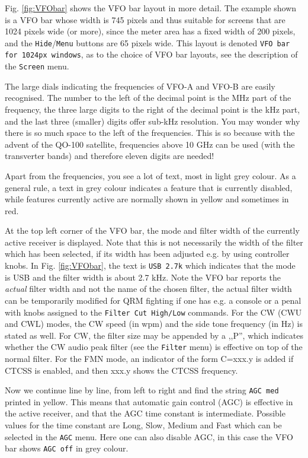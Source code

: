 \documentclass[12pt]{book}
\def\rett#1{\texttt{\color{red}#1}}
\def\bltt#1{\texttt{\color{blue}#1}}
\begin{document}
Fig. \ref{fig:VFObar} shows the VFO bar layout in more  detail.
The example shown is a VFO bar whose width is 745 pixels and
thus suitable for screens that are 1024 pixels wide (or more),
since the meter area has a fixed width of 200 pixels, and
the \rett{Hide}/\rett{Menu} buttons are 65 pixels wide. This layout is
denoted \texttt{VFO bar for 1024px windows}, as to the choice
of VFO bar layouts, see the description of the \bltt{Screen} menu.

The large dials indicating the frequencies of VFO-A and VFO-B
are easily recognised. The number to the left of the decimal
point is the MHz part of the frequency, the three  large digits
to the right  of  the decimal point is the kHz part, and
the last three (smaller) digits offer sub-kHz resolution.
You may wonder why there is  so much space to the left of
the frequencies. This is so because with the advent of
the QO-100 satellite, frequencies above 10 GHz can be
used (with the transverter bands) and therefore eleven
digits are needed!

Apart from the frequencies, you see a lot  of text, most in
light grey colour. As a general rule, a text  in grey
colour indicates a feature that is currently disabled,
while features currently active are normally shown in
yellow and sometimes in red.

At the top left  corner of the VFO bar, the mode and
filter width of the currently active receiver is displayed.
Note that this is not necessarily the width of the filter
which has been selected, if its width has been adjusted
e.g. by using controller knobs.
In Fig. \ref{fig:VFObar}, the text is \rett{USB 2.7k}
which indicates that the  mode
is USB and the filter width is about 2.7 kHz.
Note the VFO bar reports the
\textit{actual} filter width and not the name of the chosen filter,
the actual filter width can be temporarily modified for QRM fighting
if one has e.g. a console or a penal with knobs assigned to the \bltt{Filter Cut High/Low}
commands.
For the CW (CWU and CWL) modes, the CW speed (in wpm) and the side tone
frequency (in Hz) is stated as well. For CW, the filter size may be appended
by a ,,P'', which indicates whether the CW audio peak filter (see the
\bltt{Filter} menu) is effective on top of the normal filter.
For the FMN mode, an indicator of the form C=xxx.y is added if
CTCSS is enabled, and then xxx.y shows the CTCSS frequency.

Now we continue line by line, from left to right and find
the string \rett{AGC med} printed in yellow. This means
that automatic gain control (AGC)  is effective  in the
active receiver, and that the AGC time constant is
intermediate. Possible values for the time constant
are Long, Slow, Medium and Fast which can be selected
in the \bltt{AGC} menu. Here one can  also disable AGC,
in this case the VFO bar shows \rett{AGC off} in grey
colour.
\end{document}
